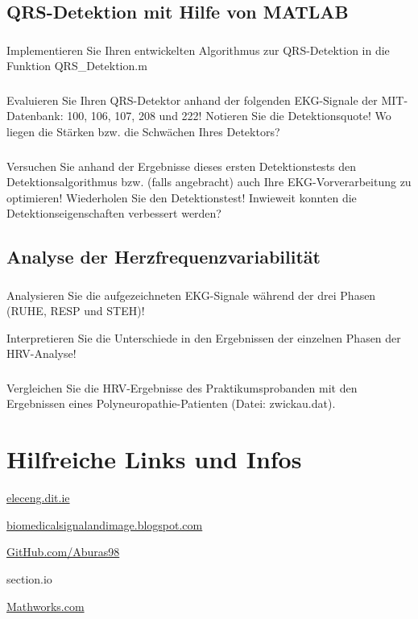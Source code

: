 \documentclass[a4paper,12pt,titlepage]{scrartcl}
\begin{document}
\subsection{QRS-Detektion mit Hilfe von MATLAB}
\subsubsection{}
Implementieren Sie Ihren entwickelten Algorithmus zur QRS-Detektion in die Funktion QRS\_Detektion.m

\subsubsection{}
Evaluieren Sie Ihren QRS-Detektor anhand der folgenden EKG-Signale der MIT-Datenbank: 100, 106, 107, 208 und 222! Notieren Sie die Detektionsquote! Wo liegen die Stärken bzw. die Schwächen Ihres Detektors?

\subsubsection{}
Versuchen Sie anhand der Ergebnisse dieses ersten Detektionstests den Detektionsalgorithmus bzw. (falls angebracht) auch Ihre EKG-Vorverarbeitung zu optimieren! Wiederholen Sie den Detektionstest! Inwieweit konnten die Detektionseigenschaften verbessert werden?

\subsection{Analyse der Herzfrequenzvariabilität}
\subsubsection{}
Analysieren Sie die aufgezeichneten EKG-Signale während der drei Phasen (RUHE, RESP und STEH)!

Interpretieren Sie die Unterschiede in den Ergebnissen der einzelnen Phasen der HRV-Analyse!

\subsubsection{}
Vergleichen Sie die HRV-Ergebnisse des Praktikumsprobanden mit den Ergebnissen eines Polyneuropathie-Patienten (Datei: zwickau.dat).


\section{Hilfreiche Links und Infos}
\href{https://eleceng.dit.ie/dorran/matlab/resources/Matlab%20Signal%20Processing%20Examples.pdf}{eleceng.dit.ie}

\href{https://biomedicalsignalandimage.blogspot.com/2016/02/matlab-code-to-plot-ecg-signal.html}{biomedicalsignalandimage.blogspot.com}

\href{https://github.com/Aburas98/MATLAB/}{GitHub.com/Aburas98}

\href{https://www.section.io/engineering-education/electrocardiograms-qrs-peak-and-heart-rate-detection-using-dwt-in-matlab/}{}section.io

\href{https://de.mathworks.com/help/dsp/ug/real-time-ecg-qrs-detection.html}{Mathworks.com}
\end{document}

